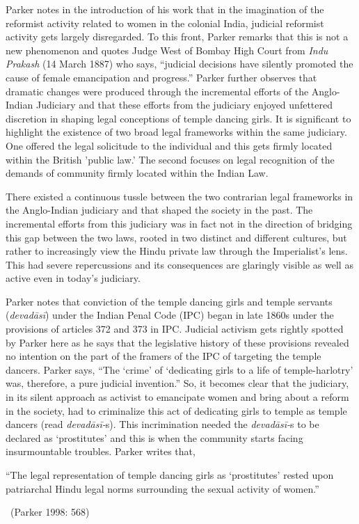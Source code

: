 Parker notes in the introduction of his work that in the imagination of the reformist activity related to women in the colonial India, judicial reformist activity gets largely disregarded. To this front, Parker remarks that this is not a new phenomenon and quotes Judge West of Bombay High Court from \textit{Indu Prakash} (14 March 1887) who says, “judicial decisions have silently promoted the cause of female emancipation and progress.” Parker further observes that dramatic changes were produced through the incremental efforts of the Anglo-Indian Judiciary and that these efforts from the judiciary enjoyed unfettered discretion in shaping legal conceptions of temple dancing girls. It is significant to highlight the existence of two broad legal frameworks within the same judiciary. One offered the legal solicitude to the individual and this gets firmly located within the British 'public law.’ The second focuses on legal recognition of the demands of community firmly located within the Indian Law.

There existed a continuous tussle between the two contrarian legal frameworks in the Anglo-Indian judiciary and that shaped the society in the past. The incremental efforts from this judiciary was in fact not in the direction of bridging this gap between the two laws, rooted in two distinct and different cultures, but rather to increasingly view the Hindu private law through the Imperialist’s lens. This had severe repercussions and its consequences are glaringly visible as well as active even in today’s judiciary.

Parker notes that conviction of the temple dancing girls and temple servants (\textit{devadāsī}) under the Indian Penal Code (IPC) began in late 1860s under the provisions of articles 372 and 373 in IPC. Judicial activism gets rightly spotted by Parker here as he says that the legislative history of these provisions revealed no intention on the part of the framers of the IPC of targeting the temple dancers. Parker says, “The `crime' of `dedicating girls to a life of temple-harlotry' was, therefore, a pure judicial invention.” So, it becomes clear that the judiciary, in its silent approach as activist to emancipate women and bring about a reform in the society, had to criminalize this act of dedicating girls to temple as temple dancers (read \textit{devadāsī-}s). This incrimination needed the \textit{devadāsī-}s to be declared as ‘prostitutes’ and this is when the community starts facing insurmountable troubles. Parker writes that,

\begin{myquote}
“The legal representation of temple dancing girls as `prostitutes' rested upon patriarchal Hindu legal norms surrounding the sexual activity of women.” 

~\hfill (Parker 1998: 568)
\end{myquote}

